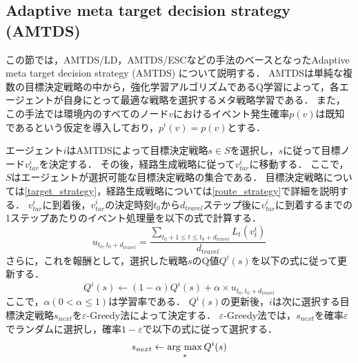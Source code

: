 \documentclass[12pt,a4j,twoside]{jarticle}
\newcommand{\argmax}{\mathop{\rm arg~max}\limits}
\begin{document}
\subsection{Adaptive meta target decision strategy (AMTDS)}\label{subsec:AMTDS}
この節では，AMTDS/LD，AMTDS/ESCなどの手法のベースとなったAdaptive meta target decision strategy (AMTDS) \cite{Yoneda2013}について説明する．
AMTDSは単純な複数の目標決定戦略の中から，強化学習アルゴリズムであるQ学習によって，各エージェントが自身にとって最適な戦略を選択するメタ戦略学習である．
また，この手法では環境内のすべてのノード$v$におけるイベント発生確率$p(v)$は既知であるという仮定を導入しており，$p^i(v) = p(v)$とする．
\par

エージェント$i$はAMTDSによって目標決定戦略$s \in S$を選択し，$s$に従って目標ノード$v^i_{tar}$を決定する．
その後，経路生成戦略に従って$v^i_{tar}$に移動する．
ここで，$S$はエージェントが選択可能な目標決定戦略の集合である．
目標決定戦略については\ref{target_strategy}，経路生成戦略については\ref{route_strategy}で詳細を説明する．
$v^i_{tar}$に到着後，$v^i_{tar}$の決定時刻$t_0$から$d_{travel}$ステップ後に$v^i_{tar}$に到着するまでの1ステップあたりのイベント処理量を以下の式で計算する．
%
\begin{equation}\label{eq:reward_AMTDS}
  u_{t_0,t_0+d_{travel}} = \dfrac{\displaystyle\sum_{t_0+1 \leq t \leq t_0+d_{travel}} L_t(v^i_t)}{d_{travel}}
\end{equation}
%
さらに，これを報酬として，選択した戦略$s$のQ値$Q^i(s)$を以下の式に従って更新する．
%
\begin{equation}
  Q^i(s) \gets (1-\alpha)Q^i(s) + \alpha \times u_{t_0,t_0+d_{travel}}
\end{equation}
%
ここで，$\alpha (0 < \alpha \leq 1)$は学習率である．
$Q^i(s)$の更新後，$i$は次に選択する目標決定戦略$s_{next}$を$\varepsilon$-Greedy法によって決定する．
$\varepsilon$-Greedy法では，$s_{next}$を確率$\varepsilon$でランダムに選択し，確率$1 - \varepsilon$で以下の式に従って選択する．
%
\begin{equation}
  s_{next} \gets \argmax_{s} Q^i(s)
\end{equation}
%
\end{document}
